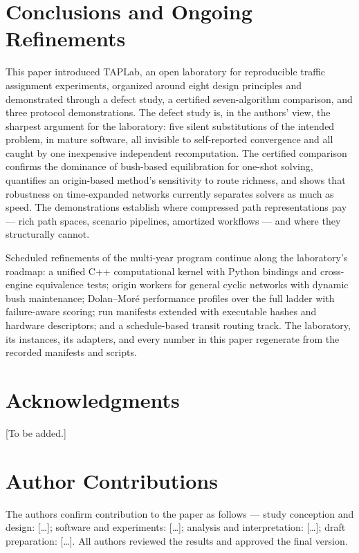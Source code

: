 \documentclass[11pt]{article}
\begin{document}
\section{Conclusions and Ongoing Refinements}

This paper introduced TAPLab, an open laboratory for reproducible traffic
assignment experiments, organized around eight design principles and
demonstrated through a defect study, a certified seven-algorithm
comparison, and three protocol demonstrations. The defect study is, in the
authors' view, the sharpest argument for the laboratory: five silent
substitutions of the intended problem, in mature software, all invisible
to self-reported convergence and all caught by one inexpensive independent
recomputation. The certified comparison confirms the dominance of
bush-based equilibration for one-shot solving, quantifies an origin-based
method's sensitivity to route richness, and shows that robustness on
time-expanded networks currently separates solvers as much as speed. The
demonstrations establish where compressed path representations pay ---
rich path spaces, scenario pipelines, amortized workflows --- and where
they structurally cannot.

Scheduled refinements of the multi-year program continue along the
laboratory's roadmap: a unified C++ computational kernel with Python
bindings and cross-engine equivalence tests; origin workers for general
cyclic networks with dynamic bush maintenance; Dolan--Mor\'e performance
profiles over the full ladder with failure-aware scoring; run manifests
extended with executable hashes and hardware descriptors; and a
schedule-based transit routing track. The laboratory, its instances, its
adapters, and every number in this paper regenerate from the recorded
manifests and scripts.

\section*{Acknowledgments}
[To be added.]

\section*{Author Contributions}
The authors confirm contribution to the paper as follows --- study
conception and design: [\dots]; software and experiments: [\dots];
analysis and interpretation: [\dots]; draft preparation: [\dots]. All
authors reviewed the results and approved the final version.
\end{document}
